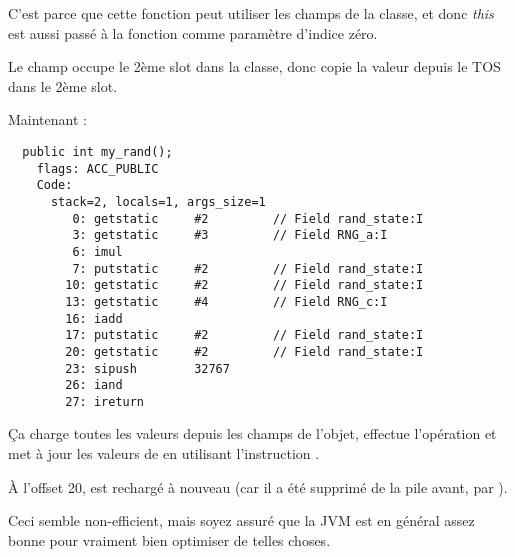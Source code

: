 C'est parce que cette fonction peut utiliser les champs de la classe, et donc \emph{this}
est aussi passé à la fonction comme paramètre d'indice zéro.

Le champ  occupe le 2ème slot dans la classe, donc 
copie la valeur depuis le \ac{TOS} dans le 2ème slot.


Maintenant :

\begin{lstlisting}
  public int my_rand();
    flags: ACC_PUBLIC
    Code:
      stack=2, locals=1, args_size=1
         0: getstatic     #2         // Field rand_state:I
         3: getstatic     #3         // Field RNG_a:I
         6: imul          
         7: putstatic     #2         // Field rand_state:I
        10: getstatic     #2         // Field rand_state:I
        13: getstatic     #4         // Field RNG_c:I
        16: iadd          
        17: putstatic     #2         // Field rand_state:I
        20: getstatic     #2         // Field rand_state:I
        23: sipush        32767
        26: iand          
        27: ireturn       
\end{lstlisting}

Ça charge toutes les valeurs depuis les champs de l'objet, effectue l'opération et
met à jour les valeurs de  en utilisant l'instruction .

À l'offset 20,   est rechargé à nouveau (car il a été supprimé de
la pile avant, par ).

Ceci semble non-efficient, mais soyez assuré que la \ac{JVM} est en général assez
bonne pour vraiment bien optimiser de telles choses.


